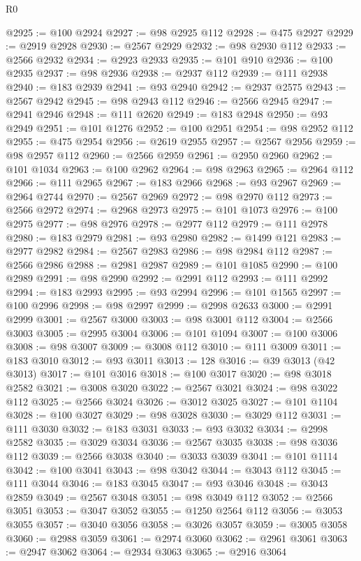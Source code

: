 \begin{lexlean}{R0}
\begin{coremodule}
@2925 := @100 @2924
@2927 := @98 @2925 @112
@2928 := @475 @2927
@2929 := @2919 @2928
@2930 := @2567 @2929
@2932 := @98 @2930 @112
@2933 := @2566 @2932
@2934 := @2923 @2933
@2935 := @101 @910
@2936 := @100 @2935
@2937 := @98 @2936
@2938 := @2937 @112
@2939 := @111 @2938
@2940 := @183 @2939
@2941 := @93 @2940
@2942 := @2937 @2575
@2943 := @2567 @2942
@2945 := @98 @2943 @112
@2946 := @2566 @2945
@2947 := @2941 @2946
@2948 := @111 @2620
@2949 := @183 @2948
@2950 := @93 @2949
@2951 := @101 @1276
@2952 := @100 @2951
@2954 := @98 @2952 @112
@2955 := @475 @2954
@2956 := @2619 @2955
@2957 := @2567 @2956
@2959 := @98 @2957 @112
@2960 := @2566 @2959
@2961 := @2950 @2960
@2962 := @101 @1034
@2963 := @100 @2962
@2964 := @98 @2963
@2965 := @2964 @112
@2966 := @111 @2965
@2967 := @183 @2966
@2968 := @93 @2967
@2969 := @2964 @2744
@2970 := @2567 @2969
@2972 := @98 @2970 @112
@2973 := @2566 @2972
@2974 := @2968 @2973
@2975 := @101 @1073
@2976 := @100 @2975
@2977 := @98 @2976
@2978 := @2977 @112
@2979 := @111 @2978
@2980 := @183 @2979
@2981 := @93 @2980
@2982 := @1499 @121
@2983 := @2977 @2982
@2984 := @2567 @2983
@2986 := @98 @2984 @112
@2987 := @2566 @2986
@2988 := @2981 @2987
@2989 := @101 @1085
@2990 := @100 @2989
@2991 := @98 @2990
@2992 := @2991 @112
@2993 := @111 @2992
@2994 := @183 @2993
@2995 := @93 @2994
@2996 := @101 @1565
@2997 := @100 @2996
@2998 := @98 @2997
@2999 := @2998 @2633
@3000 := @2991 @2999
@3001 := @2567 @3000
@3003 := @98 @3001 @112
@3004 := @2566 @3003
@3005 := @2995 @3004
@3006 := @101 @1094
@3007 := @100 @3006
@3008 := @98 @3007
@3009 := @3008 @112
@3010 := @111 @3009
@3011 := @183 @3010
@3012 := @93 @3011
@3013 := 128
@3016 := @39 @3013 (@42 @3013)
@3017 := @101 @3016
@3018 := @100 @3017
@3020 := @98 @3018 @2582
@3021 := @3008 @3020
@3022 := @2567 @3021
@3024 := @98 @3022 @112
@3025 := @2566 @3024
@3026 := @3012 @3025
@3027 := @101 @1104
@3028 := @100 @3027
@3029 := @98 @3028
@3030 := @3029 @112
@3031 := @111 @3030
@3032 := @183 @3031
@3033 := @93 @3032
@3034 := @2998 @2582
@3035 := @3029 @3034
@3036 := @2567 @3035
@3038 := @98 @3036 @112
@3039 := @2566 @3038
@3040 := @3033 @3039
@3041 := @101 @1114
@3042 := @100 @3041
@3043 := @98 @3042
@3044 := @3043 @112
@3045 := @111 @3044
@3046 := @183 @3045
@3047 := @93 @3046
@3048 := @3043 @2859
@3049 := @2567 @3048
@3051 := @98 @3049 @112
@3052 := @2566 @3051
@3053 := @3047 @3052
@3055 := @1250 @2564 @112
@3056 := @3053 @3055
@3057 := @3040 @3056
@3058 := @3026 @3057
@3059 := @3005 @3058
@3060 := @2988 @3059
@3061 := @2974 @3060
@3062 := @2961 @3061
@3063 := @2947 @3062
@3064 := @2934 @3063
@3065 := @2916 @3064

\end{coremodule}
\end{lexlean}
